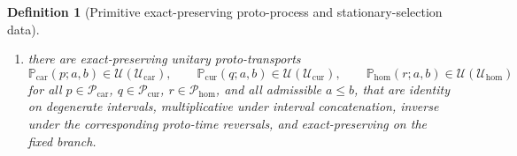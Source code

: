 \documentclass[11pt]{article}
\newcommand{\RootTensorClass}{\mathscr U_{\mathrm{car}}}
\newcommand{\RootRelabelClass}{\mathscr U_{\mathrm{cur}}}
\newcommand{\RootFreeClass}{\mathscr U_{\mathrm{hom}}}
\newcommand{\TensorProcSpace}{\mathcal P_{\mathrm{car}}}
\newcommand{\CurProcSpace}{\mathcal P_{\mathrm{cur}}}
\newcommand{\HomProcSpace}{\mathcal P_{\mathrm{hom}}}
\newcommand{\TensorFlowField}{X_{\mathrm{car}}}
\newcommand{\CurFlowField}{X_{\mathrm{cur}}}
\newcommand{\HomFlowField}{X_{\mathrm{hom}}}
\newcommand{\TensorOrbitFlow}{\Phi_{\mathrm{car}}}
\newcommand{\CurOrbitFlow}{\Phi_{\mathrm{cur}}}
\newcommand{\HomOrbitFlow}{\Phi_{\mathrm{hom}}}
\newcommand{\TensorProtoTimeRev}{\kappa_{\mathrm{car}}}
\newcommand{\CurProtoTimeRev}{\kappa_{\mathrm{cur}}}
\newcommand{\HomProtoTimeRev}{\kappa_{\mathrm{hom}}}
\newcommand{\TensorCharForm}{\boldsymbol{\theta}_{\mathrm{car}}}
\newcommand{\CurCharForm}{\boldsymbol{\theta}_{\mathrm{cur}}}
\newcommand{\HomCharForm}{\boldsymbol{\theta}_{\mathrm{hom}}}
\newcommand{\TensorCharTwo}{\boldsymbol{\omega}_{\mathrm{car}}}
\newcommand{\CurCharTwo}{\boldsymbol{\omega}_{\mathrm{cur}}}
\newcommand{\HomCharTwo}{\boldsymbol{\omega}_{\mathrm{hom}}}
\newcommand{\TensorProtoTransport}{\mathbb P_{\mathrm{car}}}
\newcommand{\CurProtoTransport}{\mathbb P_{\mathrm{cur}}}
\newcommand{\HomProtoTransport}{\mathbb P_{\mathrm{hom}}}
\newtheorem{definition}{Definition}
\begin{document}
\begin{definition}[Primitive exact-preserving proto-process and stationary-selection data]
\begin{enumerate}
\[    \CurCharTwo\equiv d\CurCharForm,\qquad
    \HomCharTwo\equiv d\HomCharForm,
    \]
    satisfying
    \[
    \TensorProtoTimeRev^*\TensorCharForm=-\TensorCharForm,\qquad
    \CurProtoTimeRev^*\CurCharForm=-\CurCharForm,\qquad
    \HomProtoTimeRev^*\HomCharForm=-\HomCharForm.
    \]
    Assume the restrictions of the characteristic two-forms to the stationary loci have one-dimensional kernels. Let the unique smooth vector fields spanning those kernels and normalized by the characteristic one-forms be denoted
    \[
    \TensorFlowField,\qquad
    \CurFlowField,\qquad
    \HomFlowField,
    \]
    so that
    \begin{equation}
    \iota_{\TensorFlowField}\left(\TensorCharTwo|_{T\TensorProcSpace}\right)=0,
    \qquad
    \TensorCharForm(\TensorFlowField)=1,
    \label{eq:char_kernel_car}
    \end{equation}
    \begin{equation}
    \iota_{\CurFlowField}\left(\CurCharTwo|_{T\CurProcSpace}\right)=0,
    \qquad
    \CurCharForm(\CurFlowField)=1,
    \label{eq:char_kernel_cur}
    \end{equation}
    \begin{equation}
    \iota_{\HomFlowField}\left(\HomCharTwo|_{T\HomProcSpace}\right)=0,
    \qquad
    \HomCharForm(\HomFlowField)=1.
    \label{eq:char_kernel_hom}
    \end{equation}
    Assume these vector fields are complete on the stationary loci, with flows denoted \(\TensorOrbitFlow^\sigma,\CurOrbitFlow^\sigma,\HomOrbitFlow^\sigma\).
    \item there are exact-preserving unitary proto-transports
    \[
    \TensorProtoTransport(p;a,b)\in\mathcal U(\RootTensorClass),\qquad
    \CurProtoTransport(q;a,b)\in\mathcal U(\RootRelabelClass),\qquad
    \HomProtoTransport(r;a,b)\in\mathcal U(\RootFreeClass)
    \]
    for all \(p\in\TensorProcSpace\), \(q\in\CurProcSpace\), \(r\in\HomProcSpace\), and all admissible \(a\le b\), that are identity on degenerate intervals, multiplicative under interval concatenation, inverse under the corresponding proto-time reversals, and exact-preserving on the fixed branch.
\end{enumerate}


\end{definition}
\end{document}
